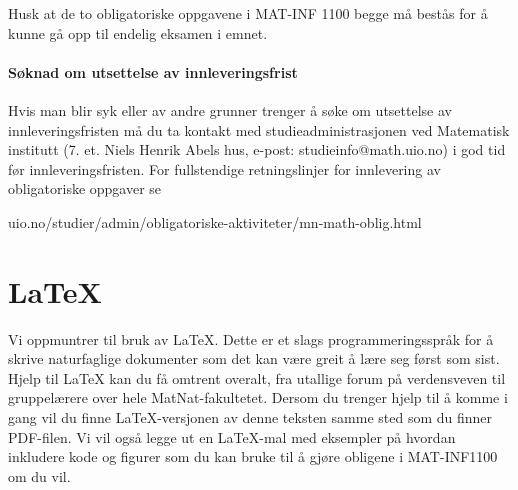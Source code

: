 \documentclass[11pt,norsk,a4paper]{article}
\begin{document}
\noindent
Husk at de to obligatoriske oppgavene i MAT-INF 1100 begge må bestås for å kunne gå opp til endelig eksamen i emnet.

\paragraph{Søknad om utsettelse av innleveringsfrist}Hvis man blir syk eller av andre grunner trenger å søke om utsettelse av innleveringsfristen må du ta kontakt med studieadministrasjonen ved Matematisk institutt (7. et. Niels Henrik Abels hus, e-post: studieinfo@math.uio.no) i god tid før innleveringsfristen. 
For fullstendige retningslinjer for innlevering av obligatoriske oppgaver se
\begin{center}
uio.no/studier/admin/obligatoriske-aktiviteter/mn-math-oblig.html
\end{center}

\section{\LaTeX}

Vi oppmuntrer til bruk av \LaTeX. Dette er et slags programmeringsspråk for å skrive naturfaglige dokumenter som det kan være greit å lære seg først som sist.
Hjelp til \LaTeX{} kan du få omtrent overalt, fra utallige forum på verdensveven til gruppelærere over hele MatNat-fakultetet. 
Dersom du trenger hjelp til å komme i gang vil du finne \LaTeX-versjonen av denne teksten samme sted som du finner PDF-filen. Vi vil også legge ut en \LaTeX-mal med eksempler på hvordan inkludere kode og figurer som du kan bruke til å gjøre obligene i MAT-INF1100 om du vil. 

\newpage
\end{document}
